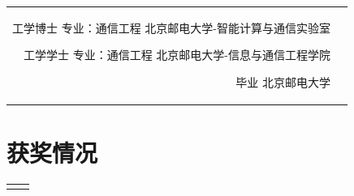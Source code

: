 \documentclass[10pt]{article} %
\begin{document}
\begin{paracol}{2}
\begin{supertabular}{rl}
		
		{工学博士} %
		{专业：通信工程} %
		{} %
		{北京邮电大学-智能计算与通信实验室} %
		
		
		{工学学士} %
		{专业：通信工程} %
		{} %
		{北京邮电大学-信息与通信工程学院} %
		
		{毕业} %
		{} %
		{} %
		{北京邮电大学} %
	\end{supertabular}
	
	
	\section{获奖情况}
	
	
	
	
	
	\begin{supertabular}{rl} %
		
		
		
		
		

\end{supertabular}
\end{paracol}
\end{document}
